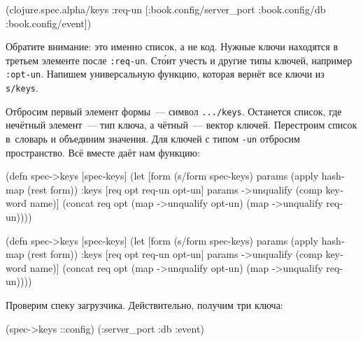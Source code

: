 \begin{english}
  \begin{clojure}
(clojure.spec.alpha/keys
 :req-un [:book.config/server_port
          :book.config/db
          :book.config/event])
  \end{clojure}
\end{english}


Обратите внимание: это именно список, а не код. Нужные ключи находятся в третьем
элементе после \verb|:req-un|. Ст\'{о}ит учесть и другие типы ключей, например
\verb|:opt-un|. Напишем универсальную функцию, которая вернёт все ключи из
\verb|s/keys|.

Отбросим первый элемент формы~--- символ \verb|.../keys|. Останется список, где
нечётный элемент~--- тип ключа, а чётный~--- вектор ключей. Перестроим список
в~словарь и объединим значения. Для ключей с типом \verb|-un| отбросим
пространство. Всё вместе даёт нам функцию:


\ifx\DEVICETYPE\MOBILE

\begin{english}
  \begin{clojure}
(defn spec->keys
  [spec-keys]
  (let [form (s/form spec-keys)
        params (apply hash-map
                 (rest form))
        {:keys [req opt req-un opt-un]}
        params
        ->unqualify (comp keyword name)]
    (concat req
            opt
            (map ->unqualify opt-un)
            (map ->unqualify req-un))))
  \end{clojure}
\end{english}

\else

\begin{english}
  \begin{clojure}
(defn spec->keys
  [spec-keys]
  (let [form (s/form spec-keys)
        params (apply hash-map (rest form))
        {:keys [req opt req-un opt-un]} params
        ->unqualify (comp keyword name)]
    (concat req
            opt
            (map ->unqualify opt-un)
            (map ->unqualify req-un))))
  \end{clojure}
\end{english}

\fi

\noindent
Проверим спеку загрузчика. Действительно, получим три ключа:

\begin{english}
  \begin{clojure}
(spec->keys ::config)
(:server_port :db :event)
  \end{clojure}
\end{english}

